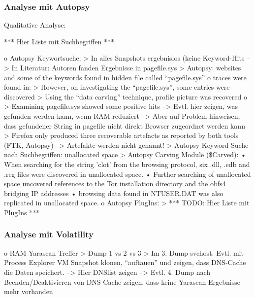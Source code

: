 \subsubsection*{Analyse mit Autopsy}
Qualitative Analyse:

*** Hier Liste mit Suchbegriffen ***

	o	Autopsy Keywortsuche: 
		>	In alles Snapshots ergebnislos (keine Keyword-Hits
		-->	In Literatur: Autoren fanden Ergebnisse in pagefile.sys 
			> Autopsy: websites and some of the keywords found in hidden file called “pagefile.sys” \cite{Mahlous.2020}
			o \cite{Montasari.2015} traces were found in: 
				> However, on investigating the “pagefile.sys”, some entries were discovered
				> Using the “data carving” technique, profile picture was recovered
			o \cite{Said.2011} 
				> Examining pagefile.sys showed some positive hits 			
		--> Evtl. hier zeigen, was gefunden werden kann, wenn RAM reduziert
		--> Aber auf Problem hinweisen, dass gefundener String in pagefile nicht direkt Browser zugeordnet werden kann
		> \cite{Gabet.2018}	Firefox only produced three recoverable artefacts as reported by both tools (FTK, Autopsy) --> Artefakte werden nicht genannt!
		> \cite{Muir.2019} Autopsy Keyword Suche nach Suchbegriffen: unallocated space
		> Autopsy Carving Module (\$Carved): \cite{Muir.2019}
			•	When searching for the string ’clot’ from the browsing protocol, six .dll, .edb and .reg files were discovered in unallocated space.
			•	Further searching of unallocated space uncovered references to the Tor installation directory and the obfs4 bridging IP addresses
			•	browsing data found in NTUSER.DAT was also replicated in unallocated space.
	o	Autopsy PlugIns:
		>	*** TODO: Hier Liste mit PlugIns ***

\subsubsection*{Analyse mit Volatility}
o	RAM Yarascan Treffer
	>	Dump 1 vs 2 vs 3 
	>	Im 3. Dump svchost: Evtl. mit Process Explorer VM Snapshot klonen, “auftauen” und zeigen, dass DNS-Cache die Daten speichert. 
	-->	Hier DNSlist zeigen
	-->	Evtl. 4. Dump nach Beenden/Deaktivieren von DNS-Cache zeigen, dass keine Yarascan Ergebnisse mehr vorhanden

